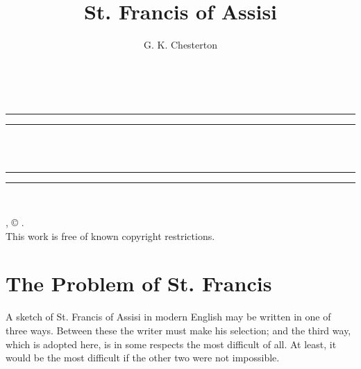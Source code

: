 \documentclass{book}
\date{}
\title{St. Francis of Assisi}
\author{G. K. Chesterton}
\begin{document}
\thispagestyle{empty}
\begin{center}
	{\Huge \@title   \\[5mm]}
\end{center}
\newpage
\thispagestyle{empty}
\cleardoublepage
\begin{center}
	\thispagestyle{empty}
	\vspace*{\baselineskip}
	\rule{\textwidth}{1.6pt}\vspace*{-\baselineskip}\vspace*{2pt}
	\rule{\textwidth}{0.4pt}\\[\baselineskip]
	{\Huge\scshape \@title   \\[5mm]}
	{\Large }
	\rule{\textwidth}{0.4pt}\vspace*{-\baselineskip}\vspace{3.2pt}
	\rule{\textwidth}{1.6pt}\\[\baselineskip]
	\vspace*{4\baselineskip}
	{\Large \@author}
	\vfill
\end{center}
\pagebreak
\newpage
\thispagestyle{empty}
\null\vfill
\noindent
\begin{center}
	{\emph{\@title}, © \@author.\\[5mm]}
	{This work is free of known copyright restrictions.\\[5mm]}
\end{center}
\pagebreak
\newpage
\setcounter{tocdepth}{0}
\setcounter{secnumdepth}{0}

\chapter{The Problem of St. Francis}
\label{chapter-0}
A sketch of St. Francis of Assisi in modern English may be written in one of three ways. Between these the writer must make his selection; and the third way, which is adopted here, is in some respects the most difficult of all. At least, it would be the most difficult if the other two were not impossible.
\end{document}
